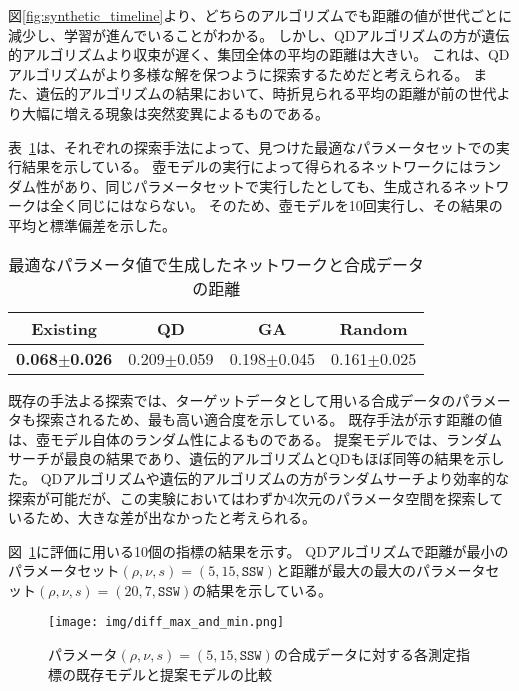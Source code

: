\documentclass[uplatex,11pt,openany]{ujreport}
\begin{document}
            図\ref{fig:synthetic_timeline}より、どちらのアルゴリズムでも距離の値が世代ごとに減少し、学習が進んでいることがわかる。
            しかし、QDアルゴリズムの方が遺伝的アルゴリズムより収束が遅く、集団全体の平均の距離は大きい。
            これは、QDアルゴリズムがより多様な解を保つように探索するためだと考えられる。
            また、遺伝的アルゴリズムの結果において、時折見られる平均の距離が前の世代より大幅に増える現象は突然変異によるものである。


            表~\ref{tab:best_synthetic_distance}は、それぞれの探索手法によって、見つけた最適なパラメータセットでの実行結果を示している。
            壺モデルの実行によって得られるネットワークにはランダム性があり、同じパラメータセットで実行したとしても、生成されるネットワークは全く同じにはならない。
            そのため、壺モデルを10回実行し、その結果の平均と標準偏差を示した。

            \begin{table}[H]
                \centering
                \caption{最適なパラメータ値で生成したネットワークと合成データの距離}
                \label{tab:best_synthetic_distance}
                \begin{tabular}{cccc}
                \hline
                Existing    & QD          & GA          & Random      \\ \hline
                \textbf{0.068$\pm$0.026} & 0.209$\pm$0.059 & 0.198$\pm$0.045 & 0.161$\pm$0.025   \\   \hline
                \end{tabular}
            \end{table}

            既存の手法よる探索では、ターゲットデータとして用いる合成データのパラメータも探索されるため、最も高い適合度を示している。
            既存手法が示す距離の値は、壺モデル自体のランダム性によるものである。
            提案モデルでは、ランダムサーチが最良の結果であり、遺伝的アルゴリズムとQDもほぼ同等の結果を示した。
            QDアルゴリズムや遺伝的アルゴリズムの方がランダムサーチより効率的な探索が可能だが、この実験においてはわずか4次元のパラメータ空間を探索しているため、大きな差が出なかったと考えられる。


            図~\ref{fig:radar_chart_synthetic}に評価に用いる10個の指標の結果を示す。
            QDアルゴリズムで距離が最小のパラメータセット$(\rho, \nu, s) = (5, 15, \texttt{SSW})$と距離が最大の最大のパラメータセット$(\rho, \nu, s) = (20, 7, \texttt{SSW})$の結果を示している。

            \begin{figure}[htbp]
                \centering
                \texttt{[image: img/diff\_max\_and\_min.png]}
                \caption{パラメータ$(\rho,\nu,s)=(5,15,\texttt{SSW})$の合成データに対する各測定指標の既存モデルと提案モデルの比較}
                \label{fig:radar_chart_synthetic}
            \end{figure}
\end{document}
